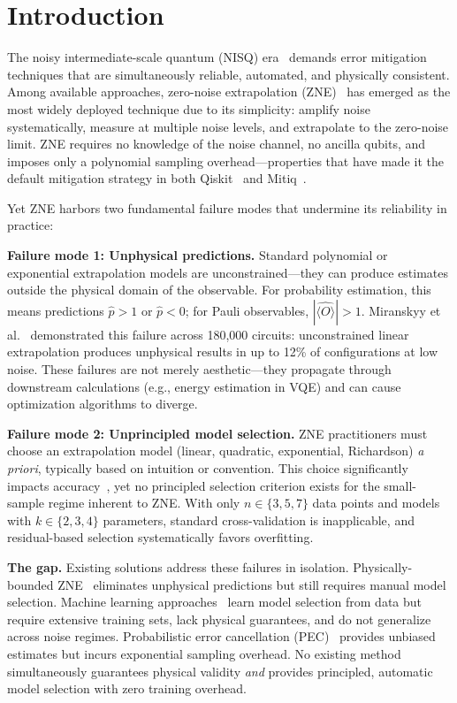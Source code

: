 \section{Introduction}
\label{sec:introduction}

The noisy intermediate-scale quantum (NISQ) era~\cite{Preskill2018} demands error mitigation techniques that are simultaneously reliable, automated, and physically consistent. Among available approaches, zero-noise extrapolation (ZNE)~\cite{Temme2017, Li2017} has emerged as the most widely deployed technique due to its simplicity: amplify noise systematically, measure at multiple noise levels, and extrapolate to the zero-noise limit. ZNE requires no knowledge of the noise channel, no ancilla qubits, and imposes only a polynomial sampling overhead---properties that have made it the default mitigation strategy in both Qiskit~\cite{Qiskit2024} and Mitiq~\cite{LaRose2022}.

Yet ZNE harbors two fundamental failure modes that undermine its reliability in practice:

\textbf{Failure mode 1: Unphysical predictions.} Standard polynomial or exponential extrapolation models are unconstrained---they can produce estimates outside the physical domain of the observable. For probability estimation, this means predictions $\hat{p} > 1$ or $\hat{p} < 0$; for Pauli observables, $|\hat{\langle O \rangle}| > 1$. Miranskyy et al.~\cite{Miranskyy2026} demonstrated this failure across 180,000 circuits: unconstrained linear extrapolation produces unphysical results in up to 12\% of configurations at low noise. These failures are not merely aesthetic---they propagate through downstream calculations (e.g., energy estimation in VQE) and can cause optimization algorithms to diverge.

\textbf{Failure mode 2: Unprincipled model selection.} ZNE practitioners must choose an extrapolation model (linear, quadratic, exponential, Richardson) \emph{a priori}, typically based on intuition or convention. This choice significantly impacts accuracy~\cite{Cai2023}, yet no principled selection criterion exists for the small-sample regime inherent to ZNE. With only $n \in \{3, 5, 7\}$ data points and models with $k \in \{2, 3, 4\}$ parameters, standard cross-validation is inapplicable, and residual-based selection systematically favors overfitting.

\textbf{The gap.} Existing solutions address these failures in isolation. Physically-bounded ZNE~\cite{Miranskyy2026} eliminates unphysical predictions but still requires manual model selection. Machine learning approaches~\cite{Liao2024, Wang2026, Strikis2021} learn model selection from data but require extensive training sets, lack physical guarantees, and do not generalize across noise regimes. Probabilistic error cancellation (PEC)~\cite{Temme2017, vandenBerg2023} provides unbiased estimates but incurs exponential sampling overhead. No existing method simultaneously guarantees physical validity \emph{and} provides principled, automatic model selection with zero training overhead.

